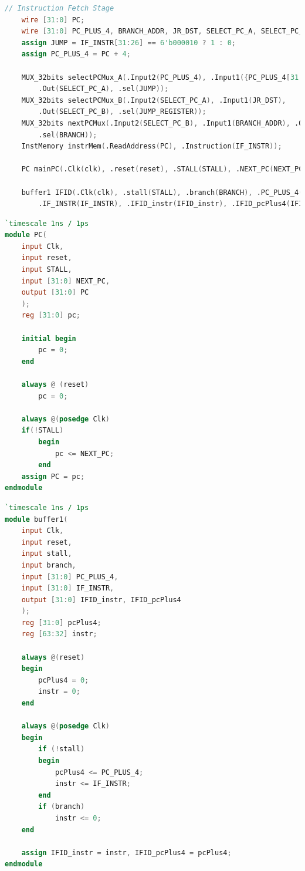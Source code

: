 \documentclass{progartcn}
\begin{document}
\begin{lstlisting}[language=verilog,caption={取址阶段},label={cd:2}]
    // Instruction Fetch Stage
    wire [31:0] PC;
    wire [31:0] PC_PLUS_4, BRANCH_ADDR, JR_DST, SELECT_PC_A, SELECT_PC_B, NEXT_PC, IF_INSTR;
    assign JUMP = IF_INSTR[31:26] == 6'b000010 ? 1 : 0;
    assign PC_PLUS_4 = PC + 4;
    
    MUX_32bits selectPCMux_A(.Input2(PC_PLUS_4), .Input1({PC_PLUS_4[31:28], IF_INSTR[26:0], 2'b00}),
        .Out(SELECT_PC_A), .sel(JUMP));
    MUX_32bits selectPCMux_B(.Input2(SELECT_PC_A), .Input1(JR_DST),
        .Out(SELECT_PC_B), .sel(JUMP_REGISTER));
    MUX_32bits nextPCMux(.Input2(SELECT_PC_B), .Input1(BRANCH_ADDR), .Out(NEXT_PC),
        .sel(BRANCH));
    InstMemory instrMem(.ReadAddress(PC), .Instruction(IF_INSTR));
    
    PC mainPC(.Clk(clk), .reset(reset), .STALL(STALL), .NEXT_PC(NEXT_PC), .PC(PC));
    
    buffer1 IFID(.Clk(clk), .stall(STALL), .branch(BRANCH), .PC_PLUS_4(PC_PLUS_4),
        .IF_INSTR(IF_INSTR), .IFID_instr(IFID_instr), .IFID_pcPlus4(IFID_pcPlus4));
\end{lstlisting}

\begin{lstlisting}[language=verilog,caption={PC.v},label={cd:3}]
`timescale 1ns / 1ps
module PC(
    input Clk,
    input reset,
    input STALL,
    input [31:0] NEXT_PC,
    output [31:0] PC
    );
    reg [31:0] pc;

    initial begin
        pc = 0;
    end 

    always @ (reset)
        pc = 0;

    always @(posedge Clk)
    if(!STALL)
        begin
            pc <= NEXT_PC;
        end
    assign PC = pc;
endmodule
\end{lstlisting}

\begin{lstlisting}[language=verilog,caption={buffer1.v},label={cd:4}]
`timescale 1ns / 1ps
module buffer1(
    input Clk,
    input reset,
    input stall,
    input branch,
    input [31:0] PC_PLUS_4,
    input [31:0] IF_INSTR,
    output [31:0] IFID_instr, IFID_pcPlus4
    );
    reg [31:0] pcPlus4;
    reg [63:32] instr;

    always @(reset)
    begin
        pcPlus4 = 0;
        instr = 0;
    end

    always @(posedge Clk)
    begin
        if (!stall)
        begin
            pcPlus4 <= PC_PLUS_4;
            instr <= IF_INSTR;
        end
        if (branch)
            instr <= 0;
    end
    
    assign IFID_instr = instr, IFID_pcPlus4 = pcPlus4;
endmodule
\end{lstlisting}
\end{document}
